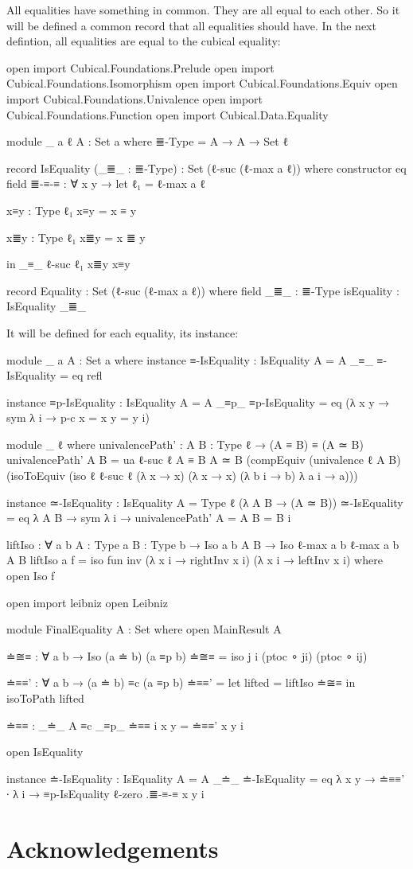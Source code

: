 \documentclass{article}
\begin{document}
All equalities have something in common. They are all equal to each other.
So it will be defined a common record that all equalities should have.
In the next defintion, all equalities are equal to the cubical equality:

\begin{code}

open import Cubical.Foundations.Prelude
open import Cubical.Foundations.Isomorphism
open import Cubical.Foundations.Equiv
open import Cubical.Foundations.Univalence
open import Cubical.Foundations.Function
open import Cubical.Data.Equality

module _ {a ℓ} {A : Set a} where
  ≣-Type = A → A → Set ℓ

  record IsEquality (_≣_ : ≣-Type) : Set (ℓ-suc (ℓ-max a ℓ)) where
    constructor eq
    field
      ≣-≡-≡ : ∀ {x y} → let
        ℓ₁ = ℓ-max a ℓ

        x≡y : Type ℓ₁
        x≡y = x ≡ y

        x≣y : Type ℓ₁
        x≣y = x ≣ y

        in _≡_ {ℓ-suc ℓ₁} x≣y x≡y

  record Equality : Set (ℓ-suc (ℓ-max a ℓ)) where
    field
      _≣_ : ≣-Type
      isEquality : IsEquality _≣_
\end{code}

It will be defined for each equality, its instance:

\begin{code}
module _ {a} {A : Set a} where
  instance
    ≡-IsEquality : IsEquality {A = A} _≡_
    ≡-IsEquality = eq refl

  instance
    ≡p-IsEquality : IsEquality {A = A} _≡p_
    ≡p-IsEquality = eq (λ {x y} → sym λ i → p-c {x = x} {y = y} i)


module _ {ℓ} where
  univalencePath' : {A B : Type ℓ} → (A ≡ B) ≡ (A ≃ B)
  univalencePath' {A} {B} =
    ua {ℓ-suc ℓ} {A ≡ B} {A ≃ B} (compEquiv (univalence {ℓ} {A} {B})
    (isoToEquiv (iso {ℓ} {ℓ-suc ℓ} (λ x → x) (λ x → x) (λ b i → b) λ a i → a)))

  instance
    ≃-IsEquality : IsEquality {A = Type ℓ} (λ A B → (A ≃ B))
    ≃-IsEquality = eq λ {A B} → sym λ i → univalencePath' {A = A} {B = B} i

liftIso : ∀ {a b} {A : Type a} {B : Type b} → Iso {a} {b} A B → Iso {ℓ-max a b} {ℓ-max a b} A B
liftIso {a} f = iso fun inv (λ x i → rightInv x i) (λ x i → leftInv x i)
  where open Iso f

open import leibniz
open Leibniz

module FinalEquality {A : Set} where
  open MainResult A

  ≐≅≡ : ∀ {a b} → Iso (a ≐ b) (a ≡p b)
  ≐≅≡ = iso j i (ptoc ∘ ji) (ptoc ∘ ij)

  ≐≡≡' : ∀ {a b} → (a ≐ b) ≡c (a ≡p b)
  ≐≡≡' = let lifted = liftIso ≐≅≡  in isoToPath lifted

  ≐≡≡ : _≐_ {A} ≡c _≡p_
  ≐≡≡ i x y = ≐≡≡' {x} {y} i

  open IsEquality

  instance
    ≐-IsEquality : IsEquality {A = A} _≐_
    ≐-IsEquality = eq λ {x} {y} → ≐≡≡' ∙ λ i → ≡p-IsEquality {ℓ-zero} .≣-≡-≡ {x} {y} i
\end{code}



\section*{Acknowledgements}



\end{document}
